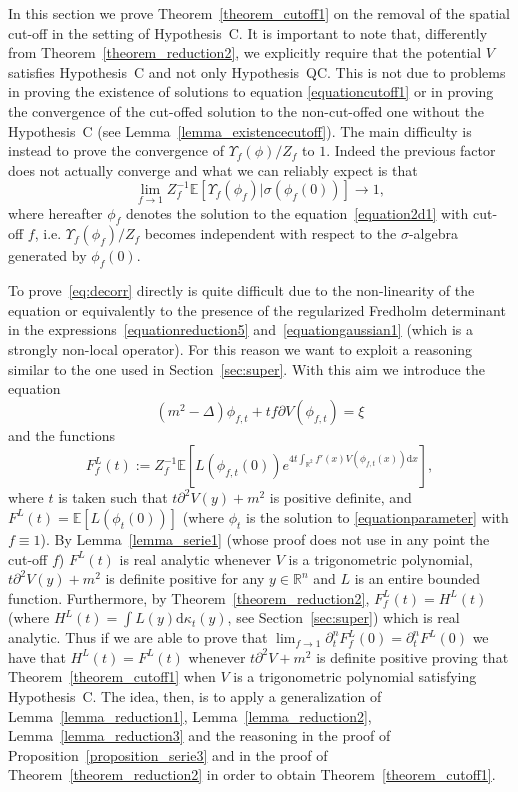 \documentclass[a4paper,10pt]{article}
\newcommand{\assign}{:=}
\newcommand{\mathd}{\mathrm{d}}
\begin{document}
\label{sec:removal}In this section we prove Theorem~\ref{theorem_cutoff1} on
the removal of the spatial cut-off in the setting of Hypothesis~C. It is
important to note that, differently from Theorem~\ref{theorem_reduction2}, we
explicitly require that the potential $V$ satisfies Hypothesis~C and not only
Hypothesis~QC. This is not due to problems in proving the existence of
solutions to equation {\eqref{equationcutoff1}} or in proving the convergence
of the cut-offed solution to the non-cut-offed one without the Hypothesis~C
(see Lemma~\ref{lemma_existencecutoff}). The main difficulty is instead to
prove the convergence of $\Upsilon_f (\phi) / Z_f$ to $1$. Indeed the previous
factor does not actually converge and what we can reliably expect is that
\begin{equation}
  \lim_{f \rightarrow 1} Z_f^{- 1} \mathbb{E} [\Upsilon_f (\phi_f) | \sigma
  (\phi_f (0))] \rightarrow 1, \label{eq:decorr}
\end{equation}
where hereafter $\phi_f$ denotes the solution to the
equation~{\eqref{equation2d1}} with cut-off $f$, i.e. $\Upsilon_f (\phi_f) /
Z_f$ becomes independent with respect to the $\sigma$-algebra generated by
$\phi_f (0)$.

To prove~{\eqref{eq:decorr}} directly is quite difficult due to the
non-linearity of the equation or equivalently to the presence of the
regularized Fredholm determinant in the
expressions~{\eqref{equationreduction5}} and~{\eqref{equationgaussian1}}
(which is a strongly non-local operator). For this reason we want to exploit a
reasoning similar to the one used in Section~\ref{sec:super}. With this aim we
introduce the equation
\begin{equation}
  (m^2 - \Delta) \phi_{f, t} + t f \partial V (\phi_{f, t}) = \xi
  \label{equationparameter}
\end{equation}
and the functions
\[ F^L_f (t) \assign Z_f^{- 1} \mathbb{E} \left[ L (\phi_{f, t} (0)) e^{4 t
   \int_{\mathbb{R}^2} f' (x) V (\phi_{f, t} (x)) \mathd x} \right], \]
where $t$ is taken such that $t \partial^2 V (y) + m^2$ is positive definite,
and $F^L (t) =\mathbb{E} [L (\phi_t (0))]$ (where $\phi_t$ is the solution to
{\eqref{equationparameter}} with $f \equiv 1$). By Lemma~\ref{lemma_serie1}
(whose proof does not use in any point the cut-off $f$) $F^L (t)$ is real
analytic whenever $V$ is a trigonometric polynomial, $t \partial^2 V (y) +
m^2$ is definite positive for any $y \in \mathbb{R}^n$ and $L$ is an entire
bounded function. Furthermore, by Theorem~\ref{theorem_reduction2}, $F^L_f (t)
= H^L (t)$ (where $H^L (t) = \int L (y) \mathd \kappa_t (y)$, see
Section~\ref{sec:super}) which is real analytic. Thus if we are able to prove
that $\lim_{f \rightarrow 1} \partial^n_t F^L_f (0) = \partial^n_t F^L (0)$ we
have that $H^L (t) = F^L (t)$ whenever $t \partial^2 V + m^2$ is definite
positive proving that Theorem~\ref{theorem_cutoff1} when $V$ is a
trigonometric polynomial satisfying Hypothesis~C. The idea, then, is to apply
a generalization of Lemma~\ref{lemma_reduction1},
Lemma~\ref{lemma_reduction2}, Lemma~\ref{lemma_reduction3} and the reasoning
in the proof of Proposition~\ref{proposition_serie3} and in the proof of
Theorem~\ref{theorem_reduction2} in order to obtain
Theorem~\ref{theorem_cutoff1}.
\end{document}
